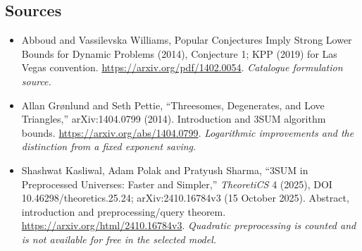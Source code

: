 \documentclass[11pt,a4paper]{article}
\numberwithin{equation}{section}
\begin{document}
\subsection{Sources}
\begin{itemize}\raggedright
\item[\textnormal{[S1]}]\hypertarget{source:30006762:1}{} Abboud and Vassilevska Williams, Popular Conjectures Imply Strong Lower Bounds for Dynamic Problems (2014), Conjecture 1; KPP (2019) for Las Vegas convention.
\url{https://arxiv.org/pdf/1402.0054}.
{\small\textit{Catalogue formulation source.}}
\item[\textnormal{[E1]}]\hypertarget{extra:30006762:1}{} Allan Gr\o nlund and Seth Pettie, ``Threesomes, Degenerates, and Love Triangles,'' arXiv:1404.0799 (2014). Introduction and 3SUM algorithm bounds.
\url{https://arxiv.org/abs/1404.0799}.
{\small\textit{Logarithmic improvements and the distinction from a fixed exponent saving.}}
\item[\textnormal{[E2]}]\hypertarget{extra:30006762:2}{} Shashwat Kasliwal, Adam Polak and Pratyush Sharma, ``3SUM in Preprocessed Universes: Faster and Simpler,'' \emph{TheoretiCS} 4 (2025), DOI 10.46298/theoretics.25.24; arXiv:2410.16784v3 (15 October 2025). Abstract, introduction and preprocessing/query theorem.
\url{https://arxiv.org/html/2410.16784v3}.
{\small\textit{Quadratic preprocessing is counted and is not available for free in the selected model.}}
\end{itemize}
\end{document}
